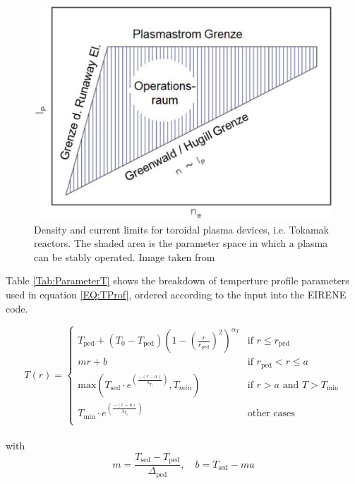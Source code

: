 		\begin{figure}[ht]
			\includegraphics[width=.8\textwidth]{./images/Mitja_PlasmastromGrenze.png}
			\caption{Density and current limits for toroidal plasma devices, i.e. Tokamak reactors. The shaded area is the parameter space in which a plasma can be stably operated. Image taken from \cite{Beckers}}
			\label{Fig:Beckers_Constr}
		\end{figure} 
	    
	                     
		\FloatBarrier
		
 		Table \ref{Tab:ParameterT} shows the breakdown of temperture profile parameters used in equation \ref{EQ:TProf}, ordered according to the input into the EIRENE code.
		
		\begin{equation}
			T(r) =
			\begin{cases}
				T_{\textrm{ped}} + (T_0 - T_{\textrm{ped}}) \left(1 - \left(\frac{r}{r_{\textrm{ped}}} \right)^2 
				\right)^{\alpha_T} &\textrm{if $r \le r_{\textrm{ped}}$}\\
				mr + b & \textrm{if $r_{\textrm{ped}} < r \le a$}\\
				\textrm{max}\left(T_{\textrm{sed}} \cdot e^{\left( \frac{-(r-a)}{\lambda_{T_1}} \right)} , 
				T_{min} \right) & \textrm{if $r > a$ and $T > T_{\textrm{min}}$}\\
				T_{\textrm{min}} \cdot e^{\left( \frac{-(r-a)}{\lambda_{T_2}} \right)} & \textrm{other cases} \\
			\end{cases}
			\label{EQ:TProf}
		\end{equation}
		~\\
		with \\
		\begin{equation*}
			m = \frac{T_{\textrm{sed}} - T_{\textrm{ped}}}{\Delta_{\textrm{ped}}}, \quad b = T_{\textrm{sed}} - ma
		\end{equation*}
		
